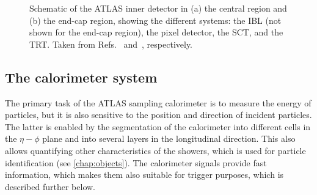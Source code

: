 
\FloatBarrier
\begin{figure}
    \caption{Schematic of the ATLAS inner detector in (a) the central region and (b) the end-cap region, showing the different systems: the IBL (not shown for the end-cap region), the pixel detector, the SCT, and the TRT. Taken from Refs.~\cite{ATL-PHYS-PUB-2015-009} and~\cite{PERF-2007-01}, respectively.}
    \label{fig:ATLASinnerdetector}
\end{figure}





\subsection{The calorimeter system}
\label{subsec:calorimeter}
The primary task of the ATLAS sampling calorimeter is to measure the energy of particles, but it is also sensitive to the position and direction of incident particles. The latter is enabled by the segmentation of the calorimeter into different cells in the $\eta-\phi$ plane and into several layers in the longitudinal direction.
This also allows quantifying other characteristics of the showers, which is used for particle identification (see \cref{chap:objects}).
The calorimeter signals provide fast information, which makes them also suitable for trigger purposes, which is described further below.

